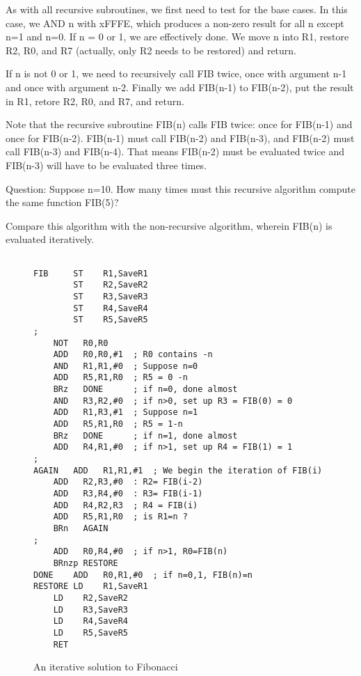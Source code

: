 \documentclass{patt}
\begin{document}
\FloatBarrier
As with all recursive subroutines, we first need to test for the base cases.
In this case, we AND n with xFFFE, which produces a non-zero result for all
n except n=1 and n=0.  If n = 0 or 1, we are effectively done.  We move n
into R1, restore R2, R0, and R7 (actually, only R2 needs to be restored) and
return.

If n is not 0 or 1, we need to recursively call FIB twice, once with argument
n-1 and once with argument n-2.  Finally we add FIB(n-1) to FIB(n-2), put the
result in R1, retore R2, R0, and R7, and return.

Note that the recursive subroutine FIB(n) calls FIB twice: once for FIB(n-1) 
and once for FIB(n-2).  FIB(n-1) must call FIB(n-2) and FIB(n-3), and FIB(n-2) 
must call FIB(n-3) and FIB(n-4).  That means FIB(n-2) must be evaluated twice 
and FIB(n-3) will have to be evaluated three times.

Question: Suppose n=10.  How many times must this recursive algorithm compute
the same function FIB(5)?

Compare this algorithm with the non-recursive algorithm, wherein FIB(n) is
evaluated iteratively.

\begin{figure}[h!]
\begin{minipage}{36pc}
\begin{Verbatim}[fontsize=\fontsize{9}{11}\selectfont]

FIB     ST    R1,SaveR1
        ST    R2,SaveR2
        ST    R3,SaveR3
        ST    R4,SaveR4
        ST    R5,SaveR5
;
	NOT   R0,R0
	ADD   R0,R0,#1  ; R0 contains -n
	AND   R1,R1,#0  ; Suppose n=0
	ADD   R5,R1,R0  ; R5 = 0 -n
	BRz   DONE      ; if n=0, done almost
	AND   R3,R2,#0  ; if n>0, set up R3 = FIB(0) = 0
	ADD   R1,R3,#1  ; Suppose n=1
	ADD   R5,R1,R0  ; R5 = 1-n
	BRz   DONE      ; if n=1, done almost
	ADD   R4,R1,#0  ; if n>1, set up R4 = FIB(1) = 1
;
AGAIN   ADD   R1,R1,#1  ; We begin the iteration of FIB(i)
	ADD   R2,R3,#0  : R2= FIB(i-2)
	ADD   R3,R4,#0  : R3= FIB(i-1)
	ADD   R4,R2,R3  ; R4 = FIB(i)
	ADD   R5,R1,R0  ; is R1=n ?
	BRn   AGAIN
;
	ADD   R0,R4,#0  ; if n>1, R0=FIB(n)
	BRnzp RESTORE
DONE    ADD   R0,R1,#0  ; if n=0,1, FIB(n)=n
RESTORE LD    R1,SaveR1
	LD    R2,SaveR2
	LD    R3,SaveR3
	LD    R4,SaveR4
	LD    R5,SaveR5
	RET
\end{Verbatim}
\caption{An iterative solution to Fibonacci}
\label{fig:bb}
\end{minipage}
\end{figure}
\end{document}
